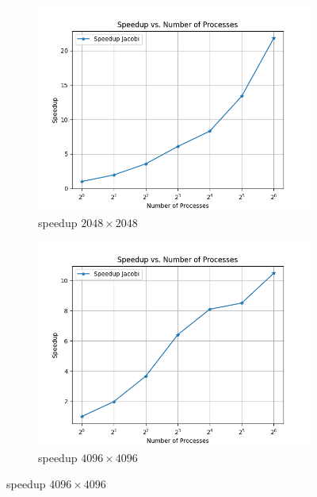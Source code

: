 \documentclass{article}
\newcommand{\eng}[1]{#1}
\begin{document}
\begin{figure}[ht]
    \centering
    \begin{subfigure}{0.45\textwidth}
        \includegraphics[width=\textwidth]{a5/plots/speedup-jacobi-small.png}
        \caption{\eng{speedup} $2048 \times 2048$}
        \label{fig:jacobi2048speedup}
    \end{subfigure}
    \begin{subfigure}{0.45\textwidth}
        \includegraphics[width=\textwidth]{a5/plots/speedup-jacobi-medium.png}
        \caption{\eng{speedup} $4096 \times 4096$}
        \label{fig:jacobi4096speedup}
    \end{subfigure}
    \vspace{1em}

\end{figure}
\end{document}
